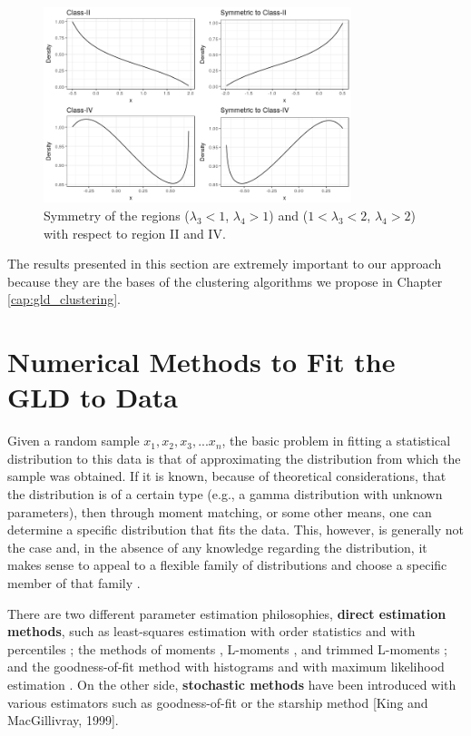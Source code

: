 \begin{figure}[H]
    \centering
    \includegraphics[width=0.8\textwidth]{img/gld/symetrics.png}
    \caption{Symmetry of the regions ($\lambda_{3}<1$, $\lambda_{4}>1$) and ($1<\lambda_{3}<2$, $\lambda_{4}>2$) with respect to  region II and IV.}
    \label{fig:symmetry}
\end{figure}

The results presented in this section are extremely important to our approach because they are the bases of the clustering algorithms we propose in Chapter \ref{cap:gld_clustering}.


\section{Numerical Methods to Fit the GLD to Data}\label{sec:gld_numerical_methods}
Given a random sample $x_{1},x_{2},x_{3},...x_{n}$, the basic problem in fitting a statistical distribution to this data is that of approximating the distribution from which the sample was obtained. If it is known, because of theoretical considerations, that the distribution is of a certain type (e.g., a gamma distribution with unknown parameters), then through moment matching, or some other means, one can determine a specific distribution that fits the data. This, however, is generally not the case and, in the absence of any knowledge regarding the distribution, it makes sense to appeal to a flexible family of distributions and choose a specific member of that family \cite{Karian2011}.

There are two different parameter estimation philosophies, \textbf{direct estimation methods}, such as least-squares estimation with order statistics and with percentiles \cite{Fournier2007, Karian2011}; the methods of moments \cite{Lodziensis2013}, L-moments \cite{Karvanen2008}, and trimmed L-moments \cite{Fournier2007}; and the goodness-of-fit method with histograms \cite{Su2005} and with maximum likelihood estimation \cite{Su2007}. On the other side, \textbf{stochastic methods} have been introduced with various estimators such as goodness-of-fit \cite{Lakhany2000} or the starship method [King and MacGillivray, 1999]. 

